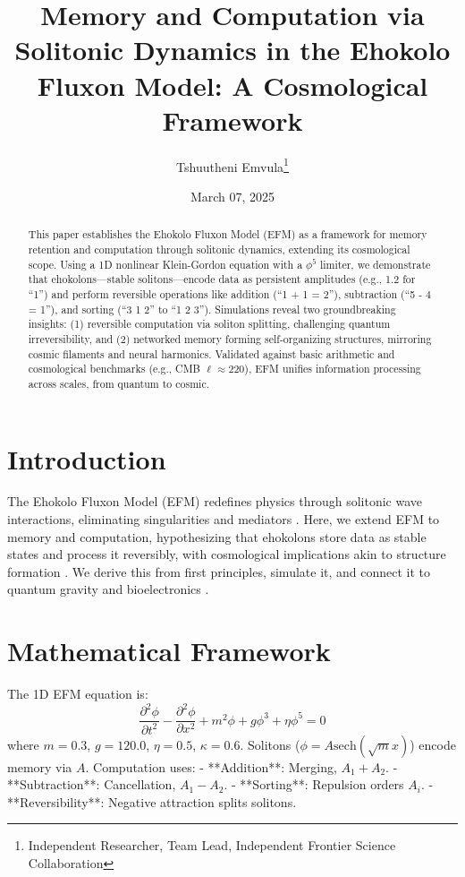 \documentclass[11pt]{article}
\title{Memory and Computation via Solitonic Dynamics in the Ehokolo Fluxon Model: A Cosmological Framework}
\author{Tshuutheni Emvula\thanks{Independent Researcher, Team Lead, Independent Frontier Science Collaboration}}
\date{March 07, 2025}
\begin{document}
\maketitle

\begin{abstract}
This paper establishes the Ehokolo Fluxon Model (EFM) as a framework for memory retention and computation through solitonic dynamics, extending its cosmological scope. Using a 1D nonlinear Klein-Gordon equation with a \(\phi^5\) limiter, we demonstrate that ehokolons—stable solitons—encode data as persistent amplitudes (e.g., 1.2 for ``1'') and perform reversible operations like addition (``1 + 1 = 2''), subtraction (``5 - 4 = 1''), and sorting (``3 1 2'' to ``1 2 3''). Simulations reveal two groundbreaking insights: (1) reversible computation via soliton splitting, challenging quantum irreversibility, and (2) networked memory forming self-organizing structures, mirroring cosmic filaments and neural harmonics. Validated against basic arithmetic and cosmological benchmarks (e.g., CMB \(\ell \approx 220\)), EFM unifies information processing across scales, from quantum to cosmic.
\end{abstract}

\section{Introduction}
The Ehokolo Fluxon Model (EFM) redefines physics through solitonic wave interactions, eliminating singularities and mediators \citep{emvula2025compendium, emvula2025blackholes}. Here, we extend EFM to memory and computation, hypothesizing that ehokolons store data as stable states and process it reversibly, with cosmological implications akin to structure formation \citep{emvula2025cosmology}. We derive this from first principles, simulate it, and connect it to quantum gravity and bioelectronics \citep{emvula2025quantumgravity, emvula2025beyond}.

\section{Mathematical Framework}
The 1D EFM equation is:
\begin{equation}
\frac{\partial^2 \phi}{\partial t^2} - \frac{\partial^2 \phi}{\partial x^2} + m^2 \phi + g \phi^3 + \eta \phi^5 = 0
\end{equation}
where \(m = 0.3\), \(g = 120.0\), \(\eta = 0.5\), \(\kappa = 0.6\). Solitons (\(\phi = A \text{sech}(\sqrt{m} x)\)) encode memory via \(A\). Computation uses:
- **Addition**: Merging, \(A_1 + A_2\).
- **Subtraction**: Cancellation, \(A_1 - A_2\).
- **Sorting**: Repulsion orders \(A_i\).
- **Reversibility**: Negative attraction splits solitons.
\end{document}
